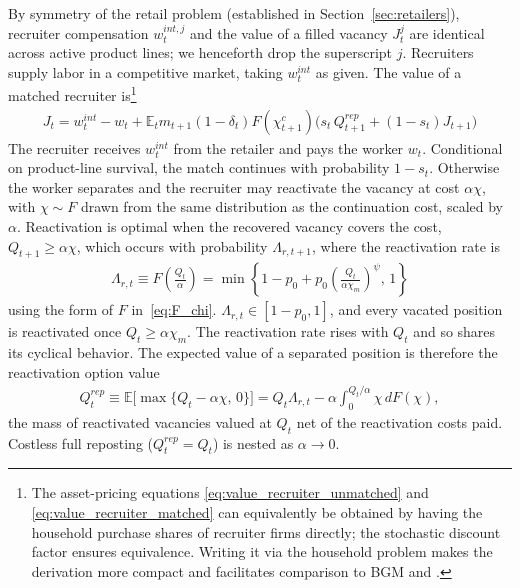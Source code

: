 \documentclass[authoryear, review, 12pt]{elsarticle}
\begin{document}
	By symmetry of the retail problem (established in 
	Section~\ref{sec:retailers}), recruiter compensation 
	$w_t^{int,j}$ and the value of a filled vacancy $J_t^j$ are 
	identical across active product lines; we henceforth drop the 
	superscript $j$. Recruiters supply labor in a competitive 
	market, taking $w_t^{int}$ as given. The value of a matched 
	recruiter is\footnote{The asset-pricing equations 
		\eqref{eq:value_recruiter_unmatched} and 
		\eqref{eq:value_recruiter_matched} can equivalently be obtained 
		by having the household purchase shares of recruiter firms 
		directly; the stochastic discount factor ensures equivalence. 
		Writing it via the household problem makes the derivation more 
		compact and facilitates comparison to BGM and 
		\citet{mortensen_1994}.}
	\begin{align}\label{eq:value_recruiter_matched}
		J_{t} = w_t^{int}-w_t + \mathbb{E}_{t}m_{t+1}
		(1-\delta_t)F(\chi_{t+1}^c)
		\bigl(s_t\, Q_{t+1}^{rep}+(1-s_t)J_{t+1}\bigr)
	\end{align}
	The recruiter receives $w_t^{int}$ from the retailer and 
	pays the worker $w_t$. Conditional on product-line survival, 
	the match continues with probability $1-s_t$. Otherwise the worker separates and the recruiter may reactivate the vacancy at cost $\alpha\chi$, with $\chi\sim F$ drawn from the same distribution as the continuation cost, scaled by $\alpha$. Reactivation is optimal when the recovered vacancy covers the cost, $Q_{t+1}\geq\alpha\chi$, which occurs with probability $\Lambda_{r,t+1}$, where the reactivation rate is
	\begin{align}\label{eq:Lambda_r}
		\Lambda_{r,t}\equiv F\!\left(\frac{Q_t}{\alpha}\right)
		=\min\left\{1-p_0+p_0\left(\frac{Q_t}{\alpha\chi_m}\right)^{\psi},\,1\right\}
	\end{align}
	using the form of $F$ in~\eqref{eq:F_chi}. $\Lambda_{r,t}\in[1-p_0,1]$, and every vacated position is reactivated once $Q_t\geq\alpha\chi_m$. The reactivation rate rises with $Q_t$ and so shares its cyclical behavior. The expected value of a separated position is therefore the reactivation option value
	\begin{align}\label{eq:Qrep}
		Q_t^{rep}\equiv\mathbb{E}\bigl[\max\{Q_t-\alpha\chi,\,0\}\bigr]
		= Q_t\Lambda_{r,t}-\alpha\int_{0}^{Q_t/\alpha}\chi\,dF(\chi),
	\end{align}
	the mass of reactivated vacancies valued at $Q_t$ net of the reactivation costs paid. Costless full reposting ($Q_t^{rep}=Q_t$) is nested as $\alpha\to0$.
	
\end{document}
